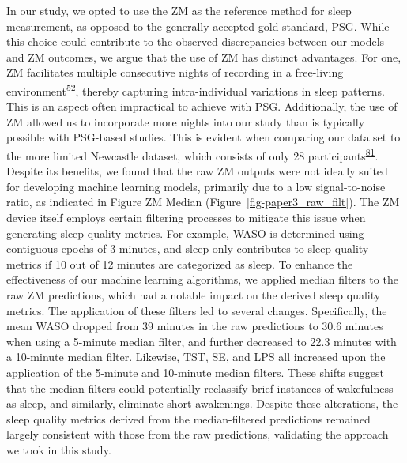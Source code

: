 \documentclass[
  10pt,
]{scrbook}
\begin{document}
In our study, we opted to use the ZM as the reference method for sleep
measurement, as opposed to the generally accepted gold standard, PSG.
While this choice could contribute to the observed discrepancies between
our models and ZM outcomes, we argue that the use of ZM has distinct
advantages. For one, ZM facilitates multiple consecutive nights of
recording in a free-living
environment\textsuperscript{\protect\hyperlink{ref-pedersen_self-administered_2021}{52}},
thereby capturing intra-individual variations in sleep patterns. This is
an aspect often impractical to achieve with PSG. Additionally, the use
of ZM allowed us to incorporate more nights into our study than is
typically possible with PSG-based studies. This is evident when
comparing our data set to the more limited Newcastle dataset, which
consists of only 28
participants\textsuperscript{\protect\hyperlink{ref-hees_novel_2015}{81}}.
Despite its benefits, we found that the raw ZM outputs were not ideally
suited for developing machine learning models, primarily due to a low
signal-to-noise ratio, as indicated in Figure ZM Median
(Figure~\ref{fig-paper3_raw_filt}). The ZM device itself employs certain
filtering processes to mitigate this issue when generating sleep quality
metrics. For example, WASO is determined using contiguous epochs of 3
minutes, and sleep only contributes to sleep quality metrics if 10 out
of 12 minutes are categorized as sleep. To enhance the effectiveness of
our machine learning algorithms, we applied median filters to the raw ZM
predictions, which had a notable impact on the derived sleep quality
metrics. The application of these filters led to several changes.
Specifically, the mean WASO dropped from 39 minutes in the raw
predictions to 30.6 minutes when using a 5-minute median filter, and
further decreased to 22.3 minutes with a 10-minute median filter.
Likewise, TST, SE, and LPS all increased upon the application of the
5-minute and 10-minute median filters. These shifts suggest that the
median filters could potentially reclassify brief instances of
wakefulness as sleep, and similarly, eliminate short awakenings. Despite
these alterations, the sleep quality metrics derived from the
median-filtered predictions remained largely consistent with those from
the raw predictions, validating the approach we took in this study.
\end{document}
